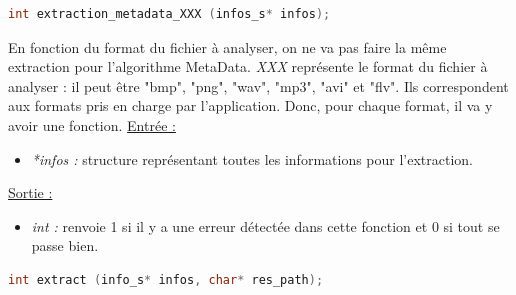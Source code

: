 \documentclass[11pt]{article}
\begin{document}
\begin{lstlisting}[language=c]
int extraction_metadata_XXX (infos_s* infos);
\end{lstlisting}

En fonction du format du fichier à analyser, on ne va pas faire la même 
extraction pour l'algorithme MetaData. 
\textit{XXX} représente le format du fichier à analyser : il peut être 
"bmp", "png", "wav", "mp3", "avi" et "flv". Ils correspondent aux formats 
pris en charge par l'application. Donc, pour chaque format, il va y avoir 
une fonction.  
\newline
\underline{Entrée :} 
\begin{itemize}
\item \textit{*infos :} structure représentant toutes les informations pour 
l'extraction. 
\end{itemize}
\underline{Sortie :} 
\begin{itemize}
\item \textit{int :} renvoie 1 si il y a une erreur détectée dans cette 
fonction et 0 si tout se passe bien.  
\newline 
\end{itemize}



\begin{lstlisting}[language=c]
int extract (info_s* infos, char* res_path); 
\end{lstlisting}
\end{document}

